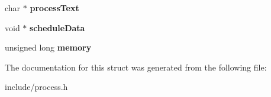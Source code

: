 \begin{DoxyCompactItemize}
\item 
\hypertarget{structProcessInfo_ae99b529cb79a446c0ff0d1a851b67fc5}{char $\ast$ {\bfseries process\-Text}}\label{dd/dc8/structProcessInfo_ae99b529cb79a446c0ff0d1a851b67fc5}

\item 
\hypertarget{structProcessInfo_aea1c50ae92f6421ae5c94ac674c1877a}{void $\ast$ {\bfseries schedule\-Data}}\label{dd/dc8/structProcessInfo_aea1c50ae92f6421ae5c94ac674c1877a}

\item 
\hypertarget{structProcessInfo_aa65ed051998c0493b68feeea5ae4955f}{unsigned long {\bfseries memory}}\label{dd/dc8/structProcessInfo_aa65ed051998c0493b68feeea5ae4955f}

\end{DoxyCompactItemize}


\-The documentation for this struct was generated from the following file\-:\begin{DoxyCompactItemize}
\item 
include/process.\-h\end{DoxyCompactItemize}

